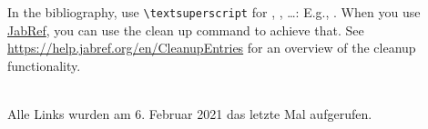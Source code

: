 \documentclass[ngerman,runningheads,a4paper]{llncs}[2018/03/10]
\begin{document}
In the bibliography, use \texttt{\textbackslash textsuperscript} for , , \ldots:
E.g., .
When you use \href{https://www.jabref.org}{JabRef}, you can use the clean up command to achieve that.
See \url{https://help.jabref.org/en/CleanupEntries} for an overview of the cleanup functionality.

\renewcommand{\bibsection}{\section*{References}} %

\begingroup
  \ifluatex
  \else
  \fi
  \small %
  
\endgroup

\ \\
%
Alle Links wurden am 6. Februar 2021 das letzte Mal aufgerufen.
\end{document}
